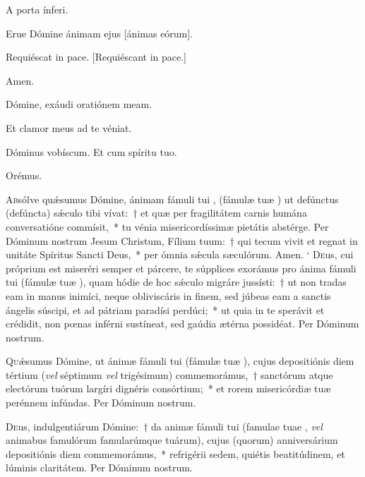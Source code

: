\documentclass[vesperale_romanum]{subfiles}
\begin{document}

\vv A porta ínferi.

\rr Erue Dómine ánimam ejus [ánimas eórum].

\vv Requiéscat in pace. [Requiéscant in pace.]

\rr Amen.

\vv Dómine, exáudi oratiónem meam.

\rr Et clamor meus ad te véniat.

\vv Dóminus vobíscum. \rr Et cum spíritu tuo.

{\centering Orémus.\par}


\oratio

\lettrine{A}{b}sólve quǽsumus Dómine, ánimam fámuli tui \nomen{}, (fámulæ tuæ \nomen{}) ut defúnctus (defúncta) sǽculo tibi vívat:~† et quæ per fragilitátem carnis humána conversatióne commísit,~* tu vénia misericordíssimæ pietátis abstérge. Per Dóminum nostrum Jesum Christum, Fílium tuum:~† qui tecum vivit et regnat in unitáte Spíritus Sancti Deus,~* per ómnia sǽcula sæculórum. \rr Amen.
`
\lettrine{D}{e}us, cui próprium est miseréri semper et párcere, te súpplices exorámus pro ánima fámuli tui \nomen{} (fámulæ tuæ \nomen{}),
quam hódie de hoc sǽculo migráre jussísti:~† ut non tradas eam in manus inimíci,
neque obliviscáris in finem, sed júbeas eam a san\-ctis ángelis súscipi, et ad pátriam paradísi perdúci;~* 
ut quia in te sperávit et crédidit, non pœnas inférni sustíneat, sed gaúdia ætérna possidéat. Per Dóminum nostrum.



\lettrine{Q}{u}ǽsumus Dómine, ut ánimæ fámuli tui \nomen{} (fámulæ tuæ \nomen{}), cujus depositiónis diem tértium (\textit{vel} séptimum \textit{vel} trigésimum) commemorámus,~† san\-ctórum atque ele\-ctórum tuórum largíri dignéris consórtium;~* et rorem misericórdiæ tuæ perénnem infúndas. Per Dóminum nostrum.


\lettrine{D}{e}us, indulgentiárum Dómine:~† da animæ fámuli tui \nomen{}
(famulae tuae \nomen, \textit{vel} animabus famulórum famularúmque
tuárum), cujus (quorum) anniversárium depositiónis diem commemorámus,~* refrigérii sedem, quiétis beatitúdinem, et lúminis
claritátem. Per Dóminum nostrum.
\end{document}
